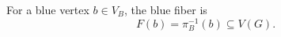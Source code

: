 \begin{definition}
For a blue vertex \(b\in V_B\), the blue fiber is
\[
F(b)=\pi_B^{-1}(b)\subseteq V(G).
\]
\end{definition}
